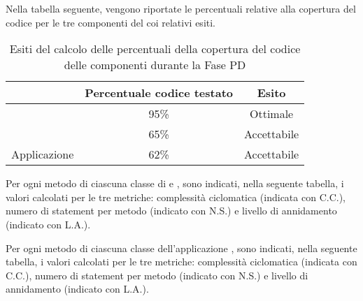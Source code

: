 				
			Nella tabella seguente, vengono riportate le percentuali relative alla copertura del codice per le tre componenti del  coi relativi esiti.
			\begin{table}[H]
					\centering
						\begin{tabu}{| l | c | c |}
							\hline
								& Percentuale codice testato	& Esito		\\ \hline \hline
								&	95\% 	& Ottimale  \\ \hline
								& 	65\%	& Accettabile  \\ \hline
							Applicazione 	& 	62\%	& Accettabile  \\ \hline
						\end{tabu}
					\caption{Esiti del calcolo delle percentuali della copertura del codice delle componenti durante la Fase PD}
				\end{table}
			Per ogni metodo di ciascuna classe di  e , sono indicati, nella seguente tabella, i valori calcolati per le tre metriche: complessità ciclomatica (indicata con C.C.), numero di statement per metodo (indicato con N.S.) e livello di annidamento (indicato con L.A.).
				
			Per ogni metodo di ciascuna classe dell'applicazione , sono indicati, nella seguente tabella, i valori calcolati per le tre metriche: complessità ciclomatica (indicata con C.C.), numero di statement per metodo (indicato con N.S.) e livello di annidamento (indicato con L.A.).
				
				
